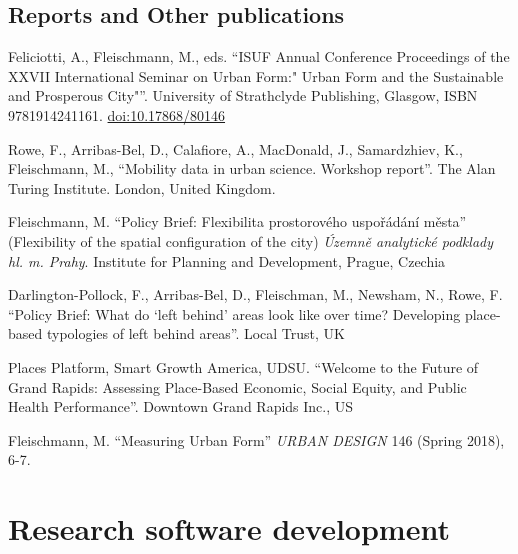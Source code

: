 \documentclass[12pt,a4paper]{report}
\begin{document}
    \subsection*{Reports and Other publications}

    \begin{tablist}

        \item[2022] \tab{}Feliciotti, A., Fleischmann, M., eds. \enquote{ISUF Annual Conference Proceedings of the XXVII International Seminar on Urban Form:" Urban Form and the Sustainable and Prosperous City"}. University of Strathclyde Publishing, Glasgow, ISBN 9781914241161. \href{https://doi.org/10.17868/80146}{doi:10.17868/80146}
        \item[2022] \tab{}Rowe, F., Arribas-Bel, D., Calafiore, A., MacDonald, J., Samardzhiev, K., Fleischmann, M., \enquote{Mobility data in urban science. Workshop report}. The Alan Turing Institute. London, United Kingdom.
        \item[2021] \tab{}Fleischmann, M. \enquote{Policy Brief: Flexibilita prostorového uspořádání města} (Flexibility of the spatial configuration of the city) \textit{Územně analytické podklady hl. m. Prahy}. Institute for Planning and Development, Prague, Czechia
        \item[2021] \tab{}Darlington-Pollock, F., Arribas-Bel, D., Fleischman, M., Newsham, N., Rowe, F. \enquote{Policy Brief: What do ‘left behind’ areas look like over time? Developing place-based typologies of left behind areas}. Local Trust, UK
        \item[2020] \tab{}Places Platform, Smart Growth America, UDSU. \enquote{Welcome to the Future of Grand Rapids: Assessing Place-Based Economic, Social Equity, and Public Health Performance}. Downtown Grand Rapids Inc., US
        \item[2018] \tab{}Fleischmann, M. \enquote{Measuring Urban Form} \textit{URBAN DESIGN} 146 (Spring 2018), 6-7.

    \end{tablist}

    \section*{Research software development}
\end{document}
